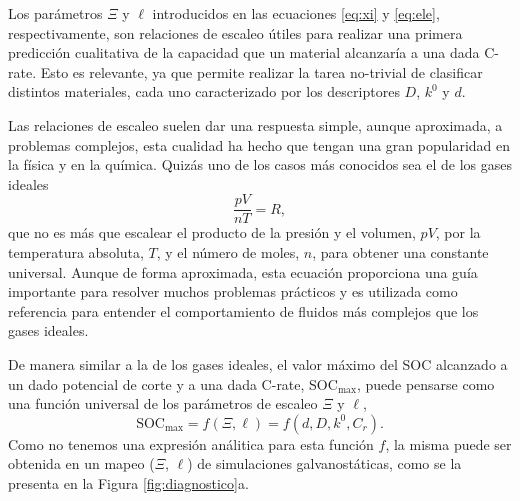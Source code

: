 Los parámetros $\Xi$ y $\ell$ introducidos en las ecuaciones \ref{eq:xi} y 
\ref{eq:ele}, respectivamente, son relaciones de escaleo útiles para realizar una
primera predicción cualitativa de la capacidad que un material alcanzaría a una
dada C-rate. Esto es relevante, ya que permite realizar la tarea no-trivial de
clasificar distintos materiales, cada uno caracterizado por los descriptores $D$,
$k^0$ y $d$.

Las relaciones de escaleo suelen dar una respuesta simple, aunque aproximada, a 
problemas complejos, esta cualidad ha hecho que tengan una gran popularidad 
en la física y en la química. Quizás uno de los casos más conocidos sea el de los
gases ideales
\begin{equation}
    \frac{p V}{n T} = R,
\end{equation}
que no es más que escalear el producto de la presión y el volumen, $p V$, por la
temperatura absoluta, $T$, y el número de moles, $n$, para obtener una constante
universal. Aunque de forma aproximada, esta ecuación proporciona una guía 
importante para resolver muchos problemas prácticos y es utilizada como referencia
para entender el comportamiento de fluidos más complejos que los gases ideales.

De manera similar a la de los gases ideales, el valor máximo del SOC alcanzado a 
un dado potencial de corte y a una dada C-rate, SOC$_{\max}$, puede 
pensarse como una función universal de los parámetros de escaleo $\Xi$ y $\ell$,
\begin{equation}\label{eq:socmax}
    \text{SOC}_{\max} = f(\Xi, \ell) = f(d, D, k^0, C_r).
\end{equation}
Como no tenemos una expresión análitica para esta función $f$, la misma puede ser 
obtenida en un mapeo ($\Xi$, $\ell$) de simulaciones galvanostáticas, como se la 
presenta en la Figura \ref{fig:diagnostico}a.

